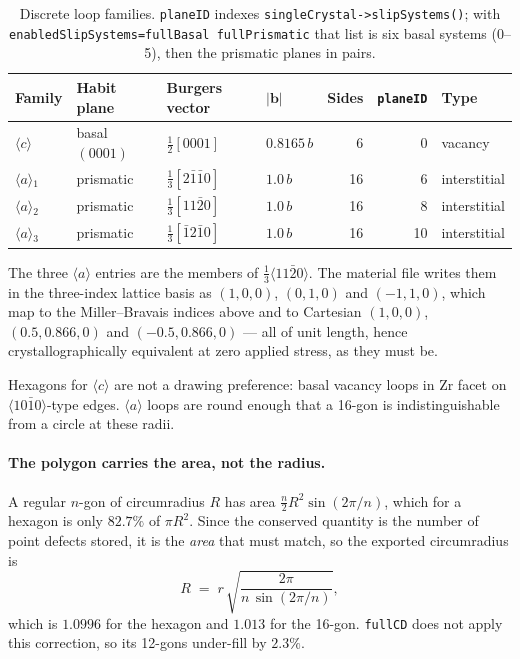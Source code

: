 \documentclass[11pt,a4paper]{article}
\newcommand{\code}[1]{\texttt{\small #1}}
\newcommand{\aloop}{\ensuremath{\langle a\rangle}}
\newcommand{\cloop}{\ensuremath{\langle c\rangle}}
\begin{document}
\begin{table}[htb]
\centering
\caption{Discrete loop families. \code{planeID} indexes
\code{singleCrystal->slipSystems()}; with
\code{enabledSlipSystems=fullBasal fullPrismatic} that list is six basal systems
(0--5), then the prismatic planes in pairs.}
\label{tab:loopcrystal}
\small
\begin{tabular}{llllrrl}
\toprule
Family & Habit plane & Burgers vector & $|\mathbf{b}|$ & Sides & \code{planeID} & Type \\
\midrule
\cloop      & basal $(0001)$ & $\tfrac{1}{2}[0001]$              & $0.8165\,b$ & 6  & 0  & vacancy \\
\aloop$_1$  & prismatic      & $\tfrac{1}{3}[2\bar{1}\bar{1}0]$  & $1.0\,b$    & 16 & 6  & interstitial \\
\aloop$_2$  & prismatic      & $\tfrac{1}{3}[11\bar{2}0]$        & $1.0\,b$    & 16 & 8  & interstitial \\
\aloop$_3$  & prismatic      & $\tfrac{1}{3}[\bar{1}2\bar{1}0]$  & $1.0\,b$    & 16 & 10 & interstitial \\
\bottomrule
\end{tabular}
\end{table}

The three \aloop{} entries are the members of $\tfrac{1}{3}\langle
11\bar{2}0\rangle$. The material file writes them in the three-index lattice
basis as $(1,0,0)$, $(0,1,0)$ and $(-1,1,0)$, which map to the Miller--Bravais
indices above and to Cartesian $(1,0,0)$, $(0.5,0.866,0)$ and $(-0.5,0.866,0)$
--- all of unit length, hence crystallographically equivalent at zero applied
stress, as they must be.

Hexagons for \cloop{} are not a drawing preference: basal vacancy loops in Zr
facet on $\langle 10\bar{1}0\rangle$-type edges. \aloop{} loops are round enough
that a 16-gon is indistinguishable from a circle at these radii.

\paragraph{The polygon carries the area, not the radius.} A regular $n$-gon of
circumradius $R$ has area $\tfrac{n}{2}R^{2}\sin(2\pi/n)$, which for a hexagon is
only $82.7\%$ of $\pi R^{2}$. Since the conserved quantity is the number of point
defects stored, it is the \emph{area} that must match, so the exported
circumradius is
\begin{equation}
  R \;=\; r\,\sqrt{\frac{2\pi}{n\,\sin(2\pi/n)}} ,
  \label{eq:circumradius}
\end{equation}
which is $1.0996$ for the hexagon and $1.013$ for the 16-gon. \code{fullCD} does
not apply this correction, so its 12-gons under-fill by $2.3\%$.
\end{document}
